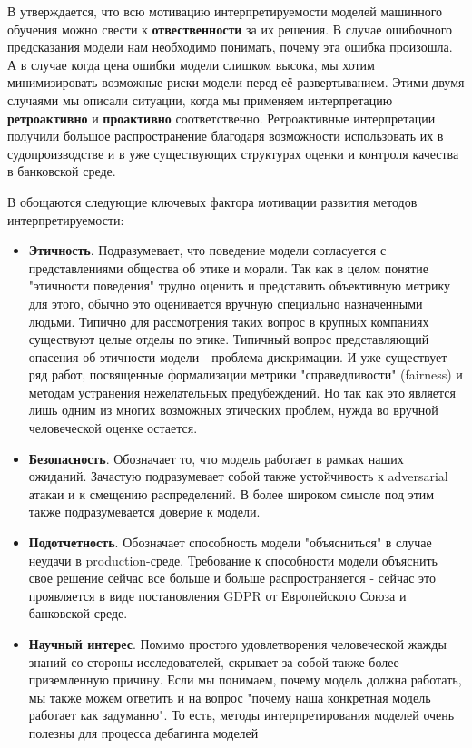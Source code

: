В \cite{madsenPosthocInterpretabilityNeural2021} утверждается, что всю мотивацию интерпретируемости моделей машинного обучения можно свести к \textbf{отвественности} за их решения. В случае ошибочного предсказания модели нам необходимо понимать, почему эта ошибка произошла. А в случае когда цена ошибки модели слишком высока, мы хотим минимизировать возможные риски модели перед её развертыванием. %
Этими двумя случаями мы описали ситуации, когда мы применяем интерпретацию \textbf{ретроактивно} и \textbf{проактивно} соответственно. Ретроактивные интерпретации получили большое распространение благодаря возможности использовать их в судопроизводстве и в уже существующих структурах оценки и контроля качества в банковской среде. %

В \cite{madsenPosthocInterpretabilityNeural2021} \cite{doshi-velezRigorousScienceInterpretable2017} обощаются следующие ключевых фактора мотивации развития методов интерпретируемости:


\begin{itemize}
    \item \textbf{Этичность}. Подразумевает, что поведение модели согласуется с представлениями общества об этике и морали. Так как в целом понятие "этичности поведения" {трудно оценить и представить объективную метрику} для этого, обычно это оценивается вручную специально назначенными людьми. Типично для рассмотрения таких вопрос в крупных компаниях существуют целые отделы по этике.
    Типичный вопрос представляющий опасения об этичности  модели - проблема дискримации. И уже существует ряд работ, посвященные формализации метрики "справедливости" (fairness) и методам устранения нежелательных предубеждений. Но так как это является лишь одним из многих возможных этических проблем, нужда во вручной человеческой оценке остается.
    \item \textbf{Безопасность}. Обозначает то, что модель работает в рамках наших ожиданий. Зачастую подразумевает собой также устойчивость к adversarial атакаи и к смещению распределений. В более широком смысле \cite{liptonMythosModelInterpretability2018} под этим также подразумевается доверие к модели.
    \item \textbf{Подотчетность}. Обозначает способность модели "объясниться" в случае неудачи в production-среде. Требование к способности модели объяснить свое решение сейчас все больше и больше распространяется - сейчас это проявляется в виде постановления GDPR от Европейского Союза и банковской среде.
    \item \textbf{Научный интерес}. Помимо простого удовлетворения человеческой жажды знаний со стороны исследователей, скрывает за собой также более приземленную причину. Если мы понимаем, почему модель должна работать, мы также можем ответить и на вопрос "почему наша конкретная модель  работает как задуманно". То есть, методы интерпретирования моделей очень полезны для процесса дебагинга моделей %
\end{itemize}



